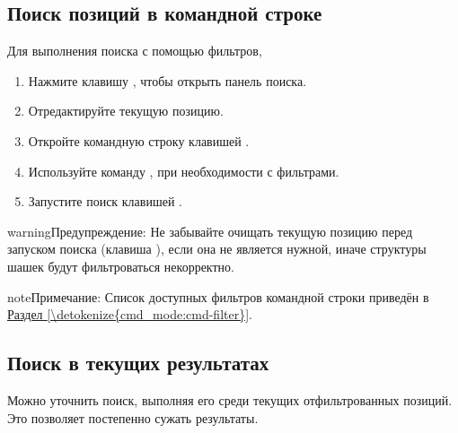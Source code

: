 \documentclass[letterpaper,10pt,russian]{sphinxmanual}
\begin{document}
\subsection{Поиск позиций в командной строке}
\label{\detokenize{annexe_filtres:recherche-de-positions-en-ligne-de-commande}}
\sphinxAtStartPar
Для выполнения поиска с помощью фильтров,
\begin{enumerate}
%
\item {} 
\sphinxAtStartPar
Нажмите клавишу , чтобы открыть панель поиска.

\item {} 
\sphinxAtStartPar
Отредактируйте текущую позицию.

\item {} 
\sphinxAtStartPar
Откройте командную строку клавишей .

\item {} 
\sphinxAtStartPar
Используйте команду , при необходимости с фильтрами.

\item {} 
\sphinxAtStartPar
Запустите поиск клавишей .

\end{enumerate}

\begin{sphinxadmonition}{warning}{Предупреждение:}
\sphinxAtStartPar
Не забывайте очищать текущую позицию перед запуском поиска (клавиша ), если она не является нужной, иначе структуры шашек будут фильтроваться некорректно.
\end{sphinxadmonition}

\begin{sphinxadmonition}{note}{Примечание:}
\sphinxAtStartPar
Список доступных фильтров командной строки приведён в \hyperref[\detokenize{cmd_mode:cmd-filter}]{Раздел \ref{\detokenize{cmd_mode:cmd-filter}}}.
\end{sphinxadmonition}


\subsection{Поиск в текущих результатах}
\label{\detokenize{annexe_filtres:recherche-dans-les-resultats-courants}}
\sphinxAtStartPar
Можно уточнить поиск, выполняя его среди текущих отфильтрованных позиций. Это позволяет постепенно сужать результаты.
\end{document}
